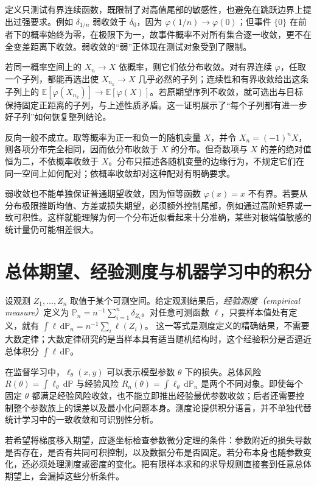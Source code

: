 定义只测试有界连续函数，既限制了对高值尾部的敏感性，也避免在跳跃边界上提出过强要求。例如 $\delta_{1/n}$ 弱收敛于 $\delta_0$，因为 $\varphi(1/n)\to\varphi(0)$；但事件 $\{0\}$ 在前者下的概率始终为零，在极限下为一，故事件概率不对所有集合逐一收敛，更不在全变差距离下收敛。弱收敛的“弱”正体现在测试对象受到了限制。

若同一概率空间上的 $X_n\to X$ 依概率，则它们依分布收敛。对有界连续 $\varphi$，任取一个子列，都能再选出使 $X_{n_k}\to X$ 几乎必然的子列；连续性和有界收敛给出这条子列上的 $\mathbb E[\varphi(X_{n_k})]\to\mathbb E[\varphi(X)]$。若原期望序列不收敛，就可选出与目标保持固定正距离的子列，与上述性质矛盾。这一证明展示了“每个子列都有进一步好子列”如何恢复整列结论。

反向一般不成立。取等概率为正一和负一的随机变量 $X$，并令 $X_n=(-1)^nX$，则各项分布完全相同，因而依分布收敛于 $X$ 的分布。但奇数项与 $X$ 的差的绝对值恒为二，不依概率收敛于 $X$。分布只描述各随机变量的边缘行为，不规定它们在同一空间上如何配对；依概率收敛却对这种配对有明确要求。

弱收敛也不能单独保证普通期望收敛，因为恒等函数 $\varphi(x)=x$ 不有界。若要从分布极限推断均值、方差或损失期望，必须额外控制尾部，例如通过高阶矩界或一致可积性。这样就能理解为何一个分布近似看起来十分准确，某些对极端值敏感的统计量仍可能相差很大。

\section{总体期望、经验测度与机器学习中的积分}
设观测 $Z_1,\ldots,Z_n$ 取值于某个可测空间。给定观测结果后，\emph{经验测度（empirical measure）}定义为
$\mathbb P_n=n^{-1}\sum_{i=1}^{n}\delta_{Z_i}$。对任意可测函数 $\ell$，只要样本值处有定义，就有
$\int\ell\,\mathrm d\mathbb P_n=n^{-1}\sum_i\ell(Z_i)$。
这一等式是测度定义的精确结果，不需要大数定律；大数定律研究的是当样本具有适当随机结构时，这个经验积分是否逼近总体积分 $\int\ell\,\mathrm d\mathbb P$。

在监督学习中，$\ell_\theta(x,y)$ 可以表示模型参数 $\theta$ 下的损失。总体风险
$R(\theta)=\int\ell_\theta\,\mathrm d\mathbb P$
与经验风险
$R_n(\theta)=\int\ell_\theta\,\mathrm d\mathbb P_n$
是两个不同对象。即使每个固定 $\theta$ 都满足经验风险收敛，也不能立即推出经验最优参数收敛；后者还需要控制整个参数族上的误差以及最小化问题本身。测度论提供积分语言，并不单独代替统计学习中的一致收敛和可识别性分析。

若希望将梯度移入期望，应逐坐标检查参数微分定理的条件：参数附近的损失导数是否存在，是否有共同可积控制，以及数据分布是否固定。若分布本身也随参数变化，还必须处理测度或密度的变化。把有限样本求和的求导规则直接套到任意总体期望上，会漏掉这些分析条件。

